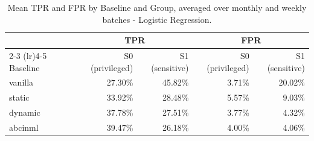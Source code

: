 \begin{table}
  \caption{Mean TPR and FPR by Baseline and Group, averaged over monthly and weekly batches - Logistic Regression.}
  \label{tab:absolute-rates-lr-combined}
  \begin{tabular}{lrrrr}
    \toprule
     & \multicolumn{2}{c}{TPR} & \multicolumn{2}{c}{FPR} \\
    \cmidrule(lr){2-3} \cmidrule(lr){4-5}
    Baseline & S0 (privileged) & S1 (sensitive) & S0 (privileged) & S1 (sensitive) \\
    \midrule
    vanilla & 27.30\% & 45.82\% & 3.71\% & 20.02\% \\
    static & 33.92\% & 28.48\% & 5.57\% & 9.03\% \\
    dynamic & 37.78\% & 27.51\% & 3.77\% & 4.32\% \\
    abcinml & 39.47\% & 26.18\% & 4.00\% & 4.06\% \\
    \bottomrule
  \end{tabular}
\end{table}
